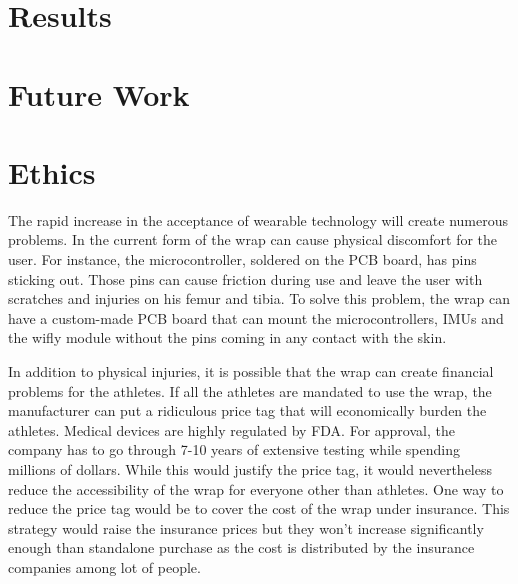 \documentclass{sig-alternate}
\begin{document}
\section{Results}
\label{sec:results}


\section{Future Work}
\label{sec:future_work}


\section{Ethics}
\label{sec:ethics}
The rapid increase in the acceptance of wearable technology will create numerous problems. In the current form of the wrap can cause physical discomfort for the user. For instance, the microcontroller, soldered on the PCB board, has pins sticking out. Those pins can cause friction during use and leave the user with scratches and injuries on his femur and tibia. To solve this problem, the wrap can have a custom-made PCB board that can mount the microcontrollers, IMUs and the wifly module without the pins coming in any contact with the skin.

In addition to physical injuries, it is possible that the wrap can create financial problems for the athletes. If all the athletes are mandated to use the wrap, the manufacturer can put a ridiculous price tag that will economically burden the athletes. Medical devices are highly regulated by FDA. For approval, the company has to go through 7-10 years of extensive testing while spending millions of dollars. While this would justify the price tag, it would nevertheless reduce the accessibility of the wrap for everyone other than athletes. One way to reduce the price tag would be to cover the cost of the wrap under insurance. This strategy would raise the insurance prices but they won’t increase significantly enough than standalone purchase as the cost is distributed by the insurance companies among lot of people.

\end{document}
